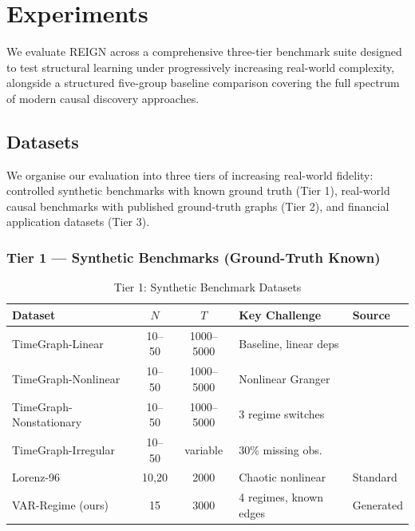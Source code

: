 \section{Experiments}

We evaluate REIGN across a comprehensive three-tier benchmark suite designed to test structural learning under progressively increasing real-world complexity, alongside a structured five-group baseline comparison covering the full spectrum of modern causal discovery approaches.

\subsection{Datasets}

We organise our evaluation into three tiers of increasing real-world fidelity: controlled synthetic benchmarks with known ground truth (Tier 1), real-world causal benchmarks with published ground-truth graphs (Tier 2), and financial application datasets (Tier 3).

\subsubsection{Tier 1 — Synthetic Benchmarks (Ground-Truth Known)}

\begin{table}[htbp]
\centering
\caption{Tier 1: Synthetic Benchmark Datasets}
\label{tab:tier1}
\begin{tabular}{lccll}
\toprule
\textbf{Dataset} & \textbf{$N$} & \textbf{$T$} & \textbf{Key Challenge} & \textbf{Source} \\
\midrule
TimeGraph-Linear        & 10–50 & 1000–5000 & Baseline, linear deps   & \cite{Ferdous2025} \\
TimeGraph-Nonlinear     & 10–50 & 1000–5000 & Nonlinear Granger       & \cite{Ferdous2025} \\
TimeGraph-Nonstationary & 10–50 & 1000–5000 & 3 regime switches       & \cite{Ferdous2025} \\
TimeGraph-Irregular     & 10–50 & variable  & 30\% missing obs.       & \cite{Ferdous2025} \\
Lorenz-96               & 10,20 & 2000      & Chaotic nonlinear       & Standard \\
VAR-Regime (ours)       & 15    & 3000      & 4 regimes, known edges  & Generated \\
\bottomrule
\end{tabular}
\end{table}

